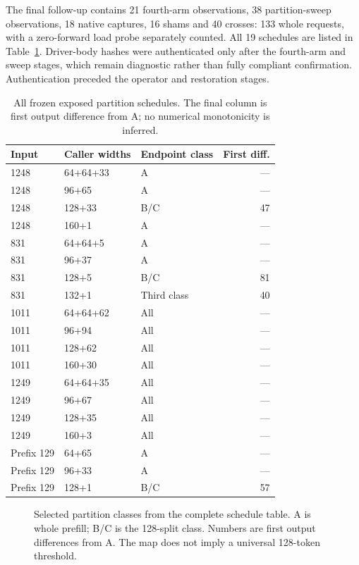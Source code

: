 The final follow-up contains 21 fourth-arm observations, 38 partition-sweep observations, 18 native captures, 16 shams and 40 crosses: 133 whole requests, with a zero-forward load probe separately counted. All 19 schedules are listed in Table~\ref{tab:allpart}. Driver-body hashes were authenticated only after the fourth-arm and sweep stages, which remain diagnostic rather than fully compliant confirmation. Authentication preceded the operator and restoration stages.
\begin{table}[t]\centering\small
\caption{All frozen exposed partition schedules. The final column is first output difference from A; no numerical monotonicity is inferred.}
\label{tab:allpart}
\begin{tabular}{@{}lllr@{}}\toprule
Input&Caller widths&Endpoint class&First diff.\\\midrule
1248&64+64+33&A&---\\
1248&96+65&A&---\\
1248&128+33&B/C&47\\
1248&160+1&A&---\\
831&64+64+5&A&---\\
831&96+37&A&---\\
831&128+5&B/C&81\\
831&132+1&Third class&40\\
1011&64+64+62&All&---\\
1011&96+94&All&---\\
1011&128+62&All&---\\
1011&160+30&All&---\\
1249&64+64+35&All&---\\
1249&96+67&All&---\\
1249&128+35&All&---\\
1249&160+3&All&---\\
Prefix 129&64+65&A&---\\
Prefix 129&96+33&A&---\\
Prefix 129&128+1&B/C&57\\\bottomrule
\end{tabular}
\end{table}
\begin{figure}[t]\centering\resizebox{\columnwidth}{!}{}
\caption{Selected partition classes from the complete schedule table. A is whole prefill; B/C is the 128-split class. Numbers are first output differences from A. The map does not imply a universal 128-token threshold.}\label{fig:partition}
\end{figure}

